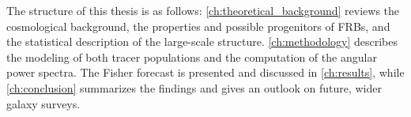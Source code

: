 The structure of this thesis is as follows: \autoref{ch:theoretical_background} reviews the
cosmological background, the properties and possible progenitors of FRBs, and the statistical
description of the large-scale structure. \autoref{ch:methodology} describes the modeling of both
tracer populations and the computation of the angular power spectra. The Fisher forecast is
presented and discussed in \autoref{ch:results}, while \autoref{ch:conclusion} summarizes the
findings and gives an outlook on future, wider galaxy surveys.
